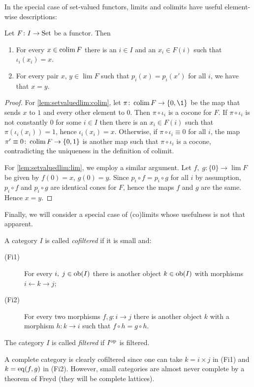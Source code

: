 \documentclass[a4paper,openany]{scrbook}
\begin{document}
In the special case of set-valued functors, limits and colimits have useful element-wise descriptions:
\begin{lemma}\label{lem:setvaluedlim}
Let $F\colon I \to \operatorname{Set}$ be a functor. Then
\begin{enumerate}
\item For every $x \in \colim F$ there is an $i \in I$ and an $x_i \in F(i)$ such that $\iota_i(x_i) = x$.\label{lem:setvaluedlim:colim}
\item For every pair $x$, $y \in \lim F$ such that $p_i(x) = p_i(x')$ for all $i$, we have that $x=y$.\label{lem:setvaluedlim:lim}
\end{enumerate}
\end{lemma}
\begin{proof}
For \eqref{lem:setvaluedlim:colim}, let $\pi\colon \colim F \to \{0,\1\}$ be the map that sends $x$ to $1$ and every other element to $0$. Then $\pi \circ \iota_i$ is a cocone for $F$. If $\pi \circ \iota_i$ is not constantly $0$ for some $i \in I$ then there is an $x_i \in F(i)$ such that $\pi(\iota_i(x_i))=1$, hence $\iota_i(x_i) = x$. Otherwise, if $\pi \circ \iota_i \equiv 0$ for all $i$, the map $\pi' \equiv 0\colon \colim F \to \{0,1\}$ is another map such that $\pi \circ \iota_i$ is a cocone, contradicting the uniqueness in the definition of colimit.

For \eqref{lem:setvaluedlim:lim}, we employ a similar argument. Let $f,\;g \colon \{0\} \to \lim F$ be given by $f(0) = x$, $g(0) = y$. Since $p_i \circ f = p_i \circ g$ for all $i$ by assumption, $p_i \circ f$ and $p_i \circ g$ are identical cones for $F$, hence the maps $f$ and $g$ are the same. Hence $x=y$.
\end{proof}

Finally, we will consider a special case of (co)limits whose usefulness is not that apparent.

\begin{defn}
A category $I$ is called \emph{cofiltered} if it is small and:
\begin{description}
\item[(Fi1)] For every $i,\;j \in \operatorname{ob}(I)$ there is another object $k \in \operatorname{ob}(I)$ with morphisms $i \leftarrow k \to j$;
\item[(Fi2)] For every two morphisms $f,g\colon i \to j$ there is another object $k$ with a morphism $h\colon k \to i$ such that $f \circ h = g \circ h$.
\end{description}
The category $I$ is called \emph{filtered} if $I^{\operatorname{op}}$ is filtered.
\end{defn}
A complete category is clearly cofiltered since one can take $k = i \times j$ in (Fi1) and $k = \operatorname{eq}(f,g)$ in (Fi2). However, small categories are almost never complete by a theorem of Freyd (they will be complete lattices).
\end{document}
